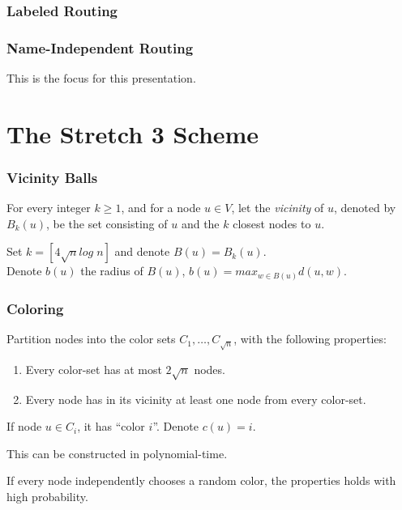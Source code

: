 \documentclass[10pt, compress]{beamer}
\begin{document}
\begin{frame}[fragile]
  \frametitle{Labeled Routing}



\end{frame}

\begin{frame}[fragile]
  \frametitle{Name-Independent Routing}


  This is the focus for this presentation.

\end{frame} 


\section{The Stretch 3 Scheme}

\begin{frame}[fragile]
  \frametitle{Vicinity Balls}

  For every integer $k \geq 1$, and for a node $u \in V$, let the \textit{vicinity} of $u$, denoted by $B_k(u)$, be the set consisting of $u$ and the $k$ closest nodes to $u$.

  Set $k=[4 \sqrt{n}log\; n]$ and denote $B(u) = B_k(u)$.\\
  Denote $b(u)$ the radius of $B(u)$, $b(u)=max_{w\in B(u)} d(u,w)$.


\end{frame}

\begin{frame}[fragile]
  \frametitle{Coloring}

  Partition nodes into the color sets $C_1,\dots,C_{\sqrt{n}}$, with the following properties:
  \begin{enumerate}
    \item Every color-set has at most $2 \sqrt{n}$ nodes.
    \item Every node has in its vicinity at least one node from every color-set.
  \end{enumerate}

  If node $u\in C_i$, it has ``color $i$''. Denote $c(u)=i$.

  This can be constructed in polynomial-time.

  If every node independently chooses a random color, the properties holds with high probability.


\end{frame}
\end{document}
